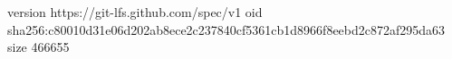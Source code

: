 version https://git-lfs.github.com/spec/v1
oid sha256:c80010d31e06d202ab8ece2c237840cf5361cb1d8966f8eebd2c872af295da63
size 466655
